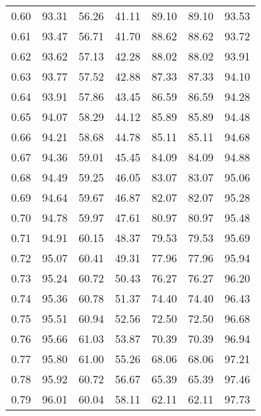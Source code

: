\begin{tabular}{|c|c|c|c|c|c|c|}
      0.60 &     93.31 &     56.26 &      41.11 &   89.10 &      89.10 &         93.53 \\
      0.61 &     93.47 &     56.71 &      41.70 &   88.62 &      88.62 &         93.72 \\
      0.62 &     93.62 &     57.13 &      42.28 &   88.02 &      88.02 &         93.91 \\
      0.63 &     93.77 &     57.52 &      42.88 &   87.33 &      87.33 &         94.10 \\
      0.64 &     93.91 &     57.86 &      43.45 &   86.59 &      86.59 &         94.28 \\
      0.65 &     94.07 &     58.29 &      44.12 &   85.89 &      85.89 &         94.48 \\
      0.66 &     94.21 &     58.68 &      44.78 &   85.11 &      85.11 &         94.68 \\
      0.67 &     94.36 &     59.01 &      45.45 &   84.09 &      84.09 &         94.88 \\
      0.68 &     94.49 &     59.25 &      46.05 &   83.07 &      83.07 &         95.06 \\
      0.69 &     94.64 &     59.67 &      46.87 &   82.07 &      82.07 &         95.28 \\
      0.70 &     94.78 &     59.97 &      47.61 &   80.97 &      80.97 &         95.48 \\
      0.71 &     94.91 &     60.15 &      48.37 &   79.53 &      79.53 &         95.69 \\
      0.72 &     95.07 &     60.41 &      49.31 &   77.96 &      77.96 &         95.94 \\
      0.73 &     95.24 &     60.72 &      50.43 &   76.27 &      76.27 &         96.20 \\
      0.74 &     95.36 &     60.78 &      51.37 &   74.40 &      74.40 &         96.43 \\
      0.75 &     95.51 &     60.94 &      52.56 &   72.50 &      72.50 &         96.68 \\
      0.76 &     95.66 &     61.03 &      53.87 &   70.39 &      70.39 &         96.94 \\
      0.77 &     95.80 &     61.00 &      55.26 &   68.06 &      68.06 &         97.21 \\
      0.78 &     95.92 &     60.72 &      56.67 &   65.39 &      65.39 &         97.46 \\
      0.79 &     96.01 &     60.04 &      58.11 &   62.11 &      62.11 &         97.73 \\

\end{tabular}
